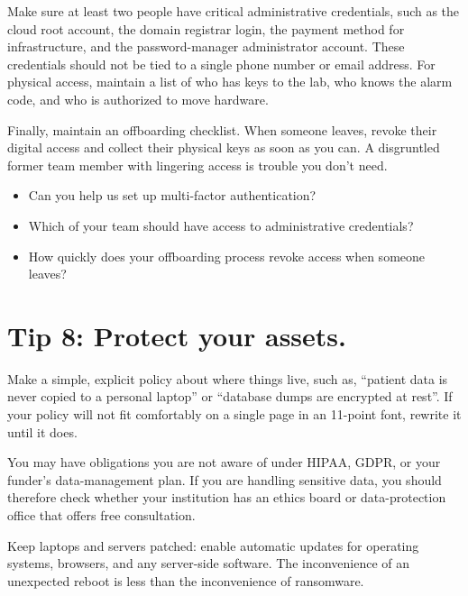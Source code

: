 \documentclass[10pt,letterpaper]{article}
\begin{document}
Make sure at least two people have critical administrative credentials, such as
the cloud root account, the domain registrar login, the payment method for
infrastructure, and the password-manager administrator account.  These
credentials should not be tied to a single phone number or email address.  For
physical access, maintain a list of who has keys to the lab, who knows the alarm
code, and who is authorized to move hardware.

Finally, maintain an offboarding checklist. When someone leaves, revoke their
digital access and collect their physical keys as soon as you can. A disgruntled
former team member with lingering access is trouble you don't need.

\begin{notebox}
  \begin{itemize}
  \item Can you help us set up multi-factor authentication?
  \item Which of your team should have access to administrative credentials?
  \item How quickly does your offboarding process revoke access when someone leaves?
  \end{itemize}
\end{notebox}

\section*{Tip 8: Protect your assets.}

Make a simple, explicit policy about where things live, such as, ``patient data
is never copied to a personal laptop'' or ``database dumps are encrypted at
rest''.  If your policy will not fit comfortably on a single page in an 11-point
font, rewrite it until it does.

\begin{notebox}
  You may have obligations you are not aware of under HIPAA, GDPR, or your
  funder's data-management plan.  If you are handling sensitive data, you should
  therefore check whether your institution has an ethics board or data-protection
  office that offers free consultation.
\end{notebox}

Keep laptops and servers patched: enable automatic updates for operating
systems, browsers, and any server-side software. The inconvenience of an
unexpected reboot is less than the inconvenience of ransomware.
\end{document}
